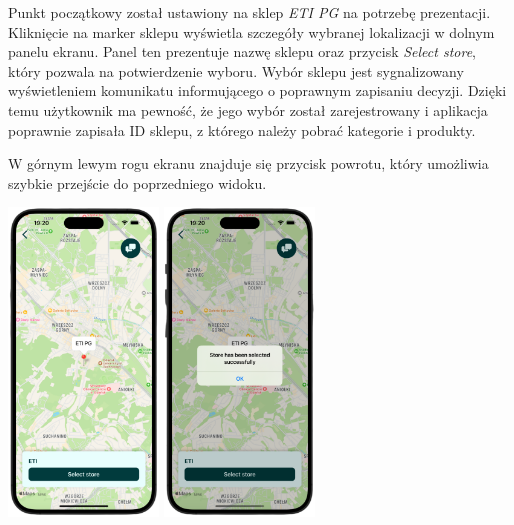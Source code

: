 Punkt początkowy został ustawiony na sklep \textit{ETI PG} na potrzebę prezentacji. Kliknięcie na marker sklepu wyświetla szczegóły wybranej lokalizacji w dolnym panelu ekranu. Panel ten prezentuje nazwę sklepu oraz przycisk \textit{Select store}, który pozwala na potwierdzenie wyboru. Wybór sklepu jest sygnalizowany wyświetleniem komunikatu informującego o poprawnym zapisaniu decyzji. Dzięki temu użytkownik ma pewność, że jego wybór został zarejestrowany i aplikacja poprawnie zapisała ID sklepu, z którego należy pobrać kategorie i produkty.

W górnym lewym rogu ekranu znajduje się przycisk powrotu, który umożliwia szybkie przejście do poprzedniego widoku. 

\begin{center}
    \includegraphics[width=0.3\textwidth]{images/front/store_selected.png}
    \includegraphics[width=0.3\textwidth]{images/front/store_success.png}
\end{center}


